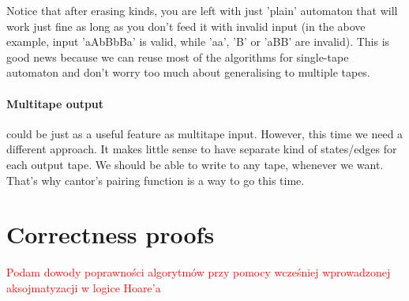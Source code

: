 \documentclass[12pt]{article}
\begin{document}
Notice that after erasing kinds, you are left with just 'plain' automaton that will work just fine as long as you don't feed it with invalid input (in the above example, input 'aAbBbBa' is valid, while  'aa', 'B' or 'aBB' are invalid). This is good news because we can reuse most of the algorithms for single-tape automaton and don't worry too much about generalising to multiple tapes. 

\paragraph{Multitape output} could be just as a useful feature as multitape input. However, this time we need a different approach. It makes little sense to have separate kind of states/edges for each output tape. We should be able to write to any tape, whenever we want. That's why cantor's pairing function is a way to go this time. 

\section{Correctness proofs}
\textcolor{red}{Podam dowody poprawności algorytmów przy pomocy wcześniej wprowadzonej aksojmatyzacji w logice Hoare'a} 
\end{document}
